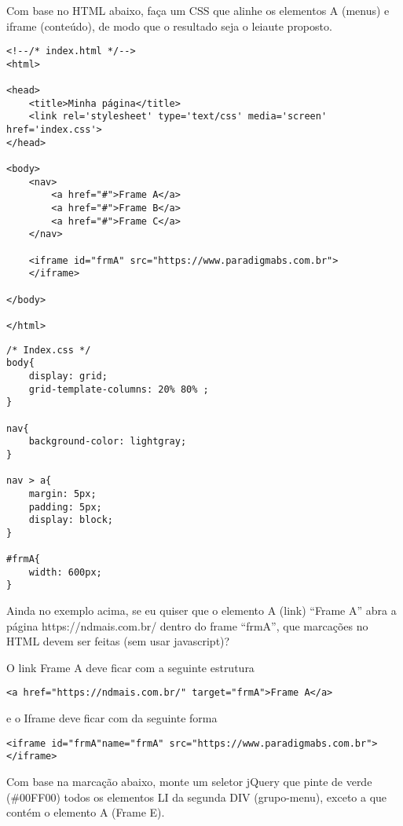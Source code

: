 \documentclass[a4 paper]{article}
\begin{document}
 Com base no HTML abaixo, faça um CSS que alinhe os elementos A (menus) e iframe (conteúdo), de modo que o resultado seja o leiaute proposto.

\begin{verbatim}
<!--/* index.html */-->
<html>

<head>
    <title>Minha página</title>
    <link rel='stylesheet' type='text/css' media='screen' href='index.css'>
</head>

<body>
    <nav>
        <a href="#">Frame A</a>
        <a href="#">Frame B</a>
        <a href="#">Frame C</a>
    </nav>

    <iframe id="frmA" src="https://www.paradigmabs.com.br">
    </iframe>

</body>

</html>
\end{verbatim}

\begin{verbatim}
/* Index.css */
body{
    display: grid;
    grid-template-columns: 20% 80% ;
}

nav{
    background-color: lightgray;
}

nav > a{
    margin: 5px;
    padding: 5px;
    display: block;
}

#frmA{
    width: 600px;
}
\end{verbatim}

\vspace{5mm}

Ainda no exemplo acima, se eu quiser que o elemento A (link) ``Frame A'' abra a página https://ndmais.com.br/ dentro do frame ``frmA'', que marcações no HTML devem ser feitas (sem usar javascript)?

O link Frame A deve ficar com a seguinte estrutura

\begin{verbatim}
<a href="https://ndmais.com.br/" target="frmA">Frame A</a>    
\end{verbatim}



e o Iframe deve ficar com da seguinte forma 

\begin{verbatim}
<iframe id="frmA"name="frmA" src="https://www.paradigmabs.com.br">
</iframe>
\end{verbatim}

\vspace{5mm}

Com base na marcação abaixo, monte um seletor jQuery que pinte de verde (\#00FF00) todos os elementos LI da segunda DIV (grupo-menu), exceto a que contém o elemento A (Frame E).
\end{document}
